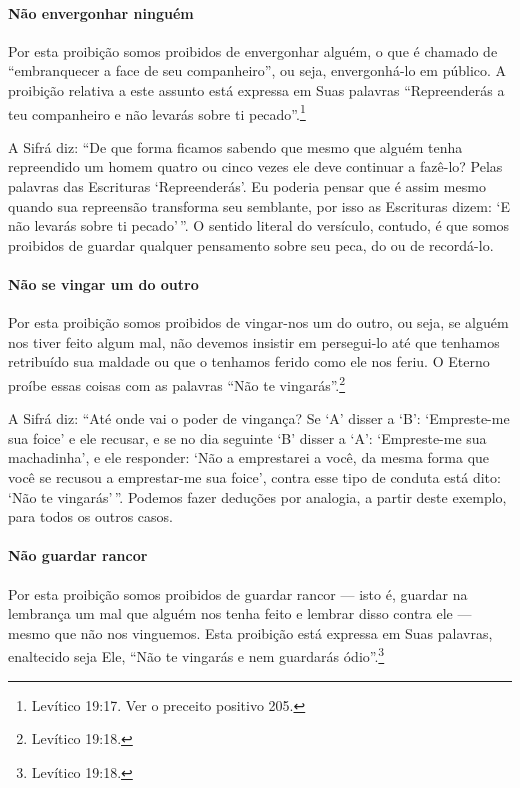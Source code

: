 \paragraph{Não envergonhar ninguém}

Por esta proibição somos proibidos de envergonhar alguém, o que é
chamado de ``embranquecer a face de seu companheiro'', ou seja,
envergonhá-lo em público. A proibição relativa a este assunto está expressa em
Suas palavras ``Repreenderás a teu companheiro e não levarás sobre ti
pecado''.\footnote{Levítico 19:17. Ver o preceito positivo 205.}

A Sifrá diz: ``De que forma ficamos sabendo que mesmo que alguém tenha
repreendido um homem quatro ou cinco vezes ele deve continuar a fazê-lo?
Pelas palavras das Escrituras `Repreenderás'. Eu poderia pensar que é
assim mesmo quando sua repreensão transforma seu semblante, por isso as
Escrituras dizem: `E não levarás sobre ti pecado'\,''. O sentido literal
do versículo, contudo, é que somos proibidos de guardar qualquer
pensamento sobre seu peca, do ou de recordá-lo.

\paragraph{Não se vingar um do outro}

Por esta proibição somos proibidos de vingar-nos um do outro, ou seja,
se alguém nos tiver feito algum mal, não devemos insistir em persegui-lo
até que tenhamos retribuído sua maldade ou que o tenhamos ferido como
ele nos feriu. O Eterno proíbe essas coisas com as palavras ``Não te
vingarás''.\footnote{Levítico 19:18.}

A Sifrá diz: ``Até onde vai o poder de vingança? Se `A' disser a `B':
`Empreste-me sua foice' e ele recusar, e se no dia seguinte `B' disser a
`A': `Empreste-me sua machadinha', e ele responder: `Não a emprestarei a
você, da mesma forma que você se recusou a emprestar-me sua foice',
contra esse tipo de conduta está dito: `Não te vingarás'\,''. Podemos
fazer deduções por analogia, a partir deste exemplo, para todos os
outros casos.

\paragraph{Não guardar rancor}

Por esta proibição somos proibidos de guardar rancor --- isto é,
guardar na lembrança um mal que alguém nos tenha feito e lembrar disso
contra ele --- mesmo que não nos vinguemos. Esta proibição está expressa
em Suas palavras, enaltecido seja Ele, ``Não te vingarás e nem
guardarás ódio''.\footnote{Levítico 19:18.}

